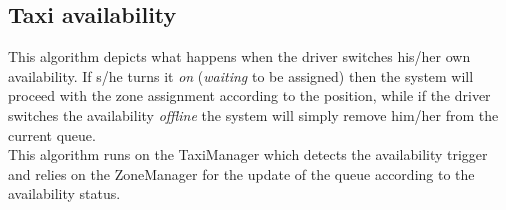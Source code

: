 \documentclass[a4paper,11pt]{report} %
\begin{document}
	\pagebreak
	
	\subsection{Taxi availability}
	This algorithm depicts what happens when the driver switches his/her own availability. If s/he turns it \textit{on} (\textit{waiting} to be assigned) then the system will proceed with the zone assignment according to the position, while if the driver switches the availability \textit{offline} the system will simply remove him/her from the current queue.\\
	This algorithm runs on the TaxiManager which detects the availability trigger and relies on the ZoneManager for the update of the queue according to the availability status.\\
	
	\begin{minipage}{\linewidth}
	\end{minipage}		
	
\end{document}
